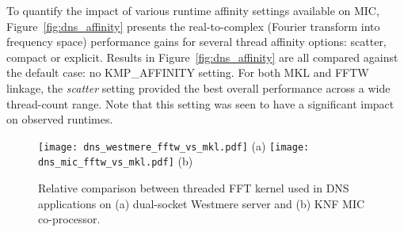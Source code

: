 
To quantify the impact of various runtime affinity settings available
on MIC, Figure~\ref{fig:dns_affinity} presents the real-to-complex
(Fourier transform into frequency space) performance gains for several
thread affinity options: scatter, compact or
explicit. Results in Figure~\ref{fig:dns_affinity} are
all compared against the default case: no KMP\_AFFINITY setting.
For both MKL and FFTW
linkage, the {\em scatter} setting provided the best overall
performance across a wide thread-count range.  Note that this
setting was seen to have a significant impact on observed runtimes.








\begin{figure}[htp]
\begin{center}
\texttt{[image: dns\_westmere\_fftw\_vs\_mkl.pdf]}
(a)
\texttt{[image: dns\_mic\_fftw\_vs\_mkl.pdf]} 
(b)
\end{center}
\vspace*{-.5cm}
\caption{Relative comparison between threaded FFT kernel
  used in DNS applications on (a) dual-socket Westmere server and (b)
  KNF MIC co-processor.}
\label{fig:mkl-vs-fftw}
\end{figure}

